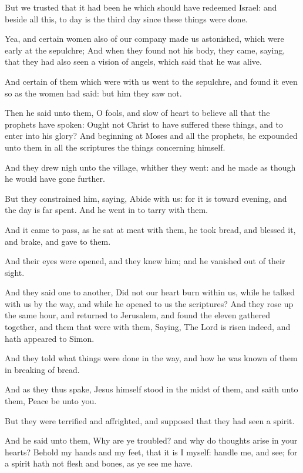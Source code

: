 \Verse But we trusted that it had been he which should have redeemed Israel: and beside all this, to day is the third day since these things were done.

\Verse Yea, and certain women also of our company made us astonished, which were early at the sepulchre; \Verse And when they found not his body, they came, saying, that they had also seen a vision of angels, which said that he was alive.

\Verse And certain of them which were with us went to the sepulchre, and found it even so as the women had said: but him they saw not.

\Verse Then he said unto them, O fools, and slow of heart to believe all that the prophets have spoken: \Verse Ought not Christ to have suffered these things, and to enter into his glory?  \Verse And beginning at Moses and all the prophets, he expounded unto them in all the scriptures the things concerning himself.

\Verse And they drew nigh unto the village, whither they went: and he made as though he would have gone further.

\Verse But they constrained him, saying, Abide with us: for it is toward evening, and the day is far spent. And he went in to tarry with them.

\Verse And it came to pass, as he sat at meat with them, he took bread, and blessed it, and brake, and gave to them.

\Verse And their eyes were opened, and they knew him; and he vanished out of their sight.

\Verse And they said one to another, Did not our heart burn within us, while he talked with us by the way, and while he opened to us the scriptures?  \Verse And they rose up the same hour, and returned to Jerusalem, and found the eleven gathered together, and them that were with them, \Verse Saying, The Lord is risen indeed, and hath appeared to Simon.

\Verse And they told what things were done in the way, and how he was known of them in breaking of bread.

\Verse And as they thus spake, Jesus himself stood in the midst of them, and saith unto them, Peace be unto you.

\Verse But they were terrified and affrighted, and supposed that they had seen a spirit.

\Verse And he said unto them, Why are ye troubled? and why do thoughts arise in your hearts?  \Verse Behold my hands and my feet, that it is I myself: handle me, and see; for a spirit hath not flesh and bones, as ye see me have.

